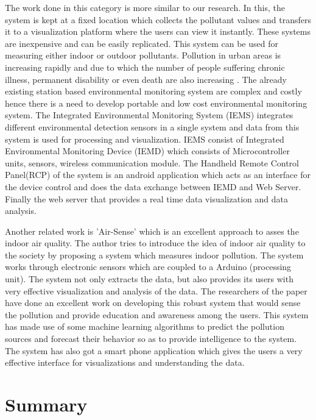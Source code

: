 The work done in this category is more similar to our research. In this, the system is kept at a fixed location which collects the pollutant values and transfers it to a visualization platform where the users can view it instantly. These systems are inexpensive and can be easily replicated. This system can be used for measuring either indoor or outdoor pollutants. Pollution in urban areas is increasing rapidly and due to which the number of people suffering chronic illness, permanent disability or even death are also increasing \cite{Wong2014}. The already existing station based environmental monitoring system are complex and costly hence there is a need to develop portable and low cost environmental monitoring system. The Integrated Environmental Monitoring System (IEMS)\cite{Wong2014} integrates different environmental detection sensors in a single  system and data from this system is used for processing and visualization. IEMS consist of Integrated Environmental Monitoring Device (IEMD) which consists of Microcontroller units, sensors, wireless communication module. The Handheld Remote Control Panel(RCP) of the system  is an android application which acts as an interface for the device control and  does the data exchange between IEMD and Web Server. Finally the web server that provides a real time data visualization and data analysis.

Another related work is 'Air-Sense'\cite{Fang2016} which is an excellent approach to asses the indoor air quality. The author tries to introduce the idea of indoor air quality to the society by proposing a system which measures indoor pollution. The system works through electronic sensors which are coupled to a Arduino (processing unit). The system not only extracts the data, but also provides its users with very effective visualization and analysis of the data. The researchers of the paper have done an excellent work on developing this robust system that would sense the pollution and provide education and awareness among the users. This system has made use of some machine learning algorithms to predict the pollution sources and forecast their behavior so as to provide intelligence to the system. 
The system has also got a smart phone application which gives the users a very effective interface for visualizations and understanding the data.

 \section{Summary}